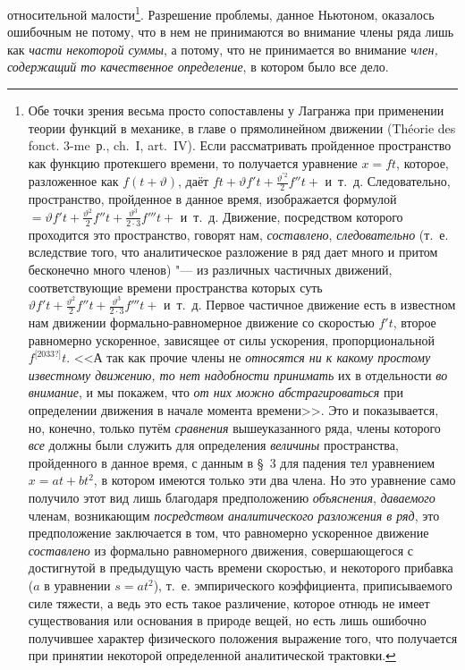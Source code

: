 относительной малости\footnote{Обе точки зрения весьма просто
сопоставлены у Лагранжа при
применении теории функций в механике, в главе о прямолинейном движении
(Théorie des fonct. 3-me~р., ch.~I, art.~IV). Если
рассматривать пройденное пространство как функцию протекшего времени, то
получается уравнение $x=ft$, которое, разложенное
как $f(t+\vartheta )$, даёт
$ft + \vartheta f't + \frac{\vartheta ^{'2}} 2 f''t + $
и~т.~д. Следовательно, пространство, пройденное в данное время,
изображается формулой
$ = \vartheta f't+\frac{\vartheta ^2}
2 f''t + \frac{\vartheta ^3}{2 \cdot 3} f'''t + $
и~т.~д. Движение, посредством которого проходится это
пространство, говорят нам, {\em составлено}, {\em следовательно} (т.~е.
вследствие того, что аналитическое разложение в ряд дает много и притом
бесконечно много членов) "--- из различных частичных движений,
соответствующие времени пространства которых суть
$ \vartheta f't+\frac{\vartheta ^2}
2 f''t + \frac{\vartheta ^3}{2 \cdot 3} f'''t + $
и~т.~д. Первое частичное
движение есть в известном нам движении формально-равномерное движение со
скоростью $f't$, второе равномерно ускоренное, зависящее
от силы ускорения, пропорциональной $f^{\text{[2033?]}}t$.
<<А так как прочие члены не {\em относятся ни к какому простому
известному движению, то нет надобности принимать} их в
отдельности {\em во внимание}, и мы покажем, что
{\em от них можно абстрагироваться} при определении движения в
начале момента времени>>. Это и показывается, но, конечно, только путём
{\em сравнения} вышеуказанного ряда, члены которого {\em все} должны были
служить для определения {\em величины}
пространства, пройденного в данное время, с данным в \S~3 для
падения тел уравнением $x=at+bt^2$, в
котором имеются только эти два члена. Но это уравнение само получило этот
вид лишь благодаря предположению {\em объяснения}, {\em даваемого} членам,
возникающим {\em посредством аналитического разложения в ряд},
это предположение заключается в том, что равномерно ускоренное движение
{\em составлено} из формально равномерного движения, совершающегося
с достигнутой в предыдущую часть времени скоростью, и некоторого прибавка
($a$ в уравнении $s=at^2$), т.~е. эмпирического коэффициента,
приписываемого силе тяжести, а ведь это есть такое различение, которое
отнюдь не имеет существования или основания в природе вещей, но есть лишь
ошибочно получившее характер физического положения выражение того, что
получается при принятии некоторой определенной аналитической трактовки.}.
Разрешение проблемы, данное Ньютоном, оказалось ошибочным не потому, что в
нем не принимаются во внимание члены ряда лишь как
{\em части некоторой суммы}, а потому, что не
принимается во внимание {\em член, содержащий то
качественное определение}, в котором было все дело.

